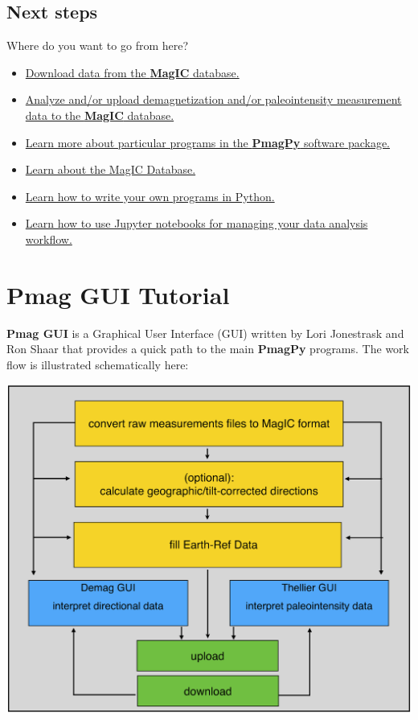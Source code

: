 \documentclass[11pt]{book}
\begin{document}
{%
\section{Next steps}

Where do you want to go from here?

\begin{itemize}
\item \href{#magic_download}{Download data from the {\bf MagIC} database.}
\item \href{#pmag_gui.py}{Analyze and/or upload demagnetization and/or paleointensity measurement data to the {\bf MagIC} database. }
\item \href{#PmagPy}{Learn more about particular programs in the {\bf PmagPy} software package.}
\item \href{#MagICDatabase}{Learn about the MagIC Database.}
\item \href{#Python}{Learn how to write your own programs in Python.}
\item \href{#Notebooks}{Learn how to use Jupyter notebooks for managing your data analysis workflow.}
\end{itemize}



\chapter{Pmag GUI Tutorial}
\label{chap:Pmag GUI}

{\bf Pmag GUI} is a Graphical User Interface (GUI) written by Lori Jonestrask and Ron Shaar  that provides a quick path to the main {\bf PmagPy} programs. The work flow is illustrated schematically here:

\includegraphics[width=15cm]{EPSfiles/FigQkMagicFlow.eps}

}
\end{document}
